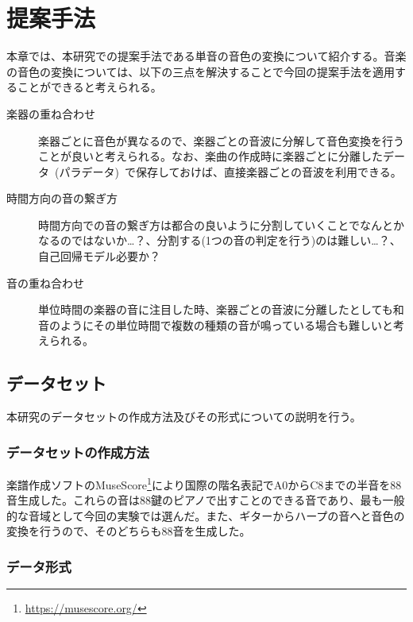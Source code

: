 \chapter{提案手法}

本章では、本研究での提案手法である単音の音色の変換について紹介する。音楽の音色の変換については、以下の三点を解決することで今回の提案手法を適用することができると考えられる。

\begin{description}

\item[楽器の重ね合わせ]\mbox{}

楽器ごとに音色が異なるので、楽器ごとの音波に分解して音色変換を行うことが良いと考えられる。なお、楽曲の作成時に楽器ごとに分離したデータ~(パラデータ)~で保存しておけば、直接楽器ごとの音波を利用できる。

\item[時間方向の音の繋ぎ方]\mbox{}

時間方向での音の繋ぎ方は都合の良いように分割していくことでなんとかなるのではないか…？、分割する(1つの音の判定を行う)のは難しい…？、自己回帰モデル必要か？

\item[音の重ね合わせ]\mbox{}

単位時間の楽器の音に注目した時、楽器ごとの音波に分離したとしても和音のようにその単位時間で複数の種類の音が鳴っている場合も難しいと考えられる。

\end{description}

\section{データセット}

本研究のデータセットの作成方法及びその形式についての説明を行う。

\subsection{データセットの作成方法}

楽譜作成ソフトのMuseScore\footnote{\url{https://musescore.org/}}により国際の階名表記でA0からC8までの半音を88音生成した。これらの音は88鍵のピアノで出すことのできる音であり、最も一般的な音域として今回の実験では選んだ。また、ギターからハープの音へと音色の変換を行うので、そのどちらも88音を生成した。

\subsection{データ形式}

